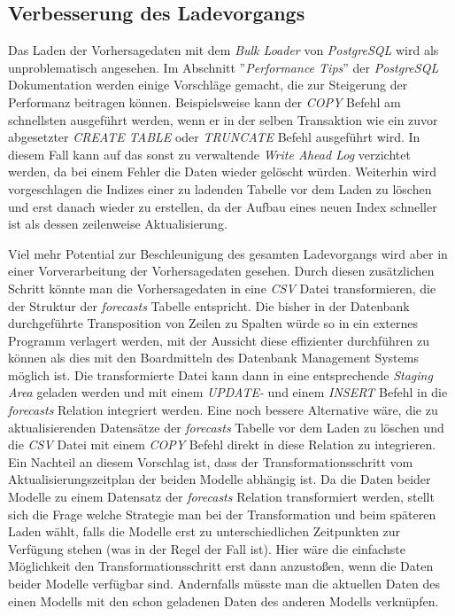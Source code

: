 \subsection{Verbesserung des Ladevorgangs}
Das Laden der Vorhersagedaten mit dem \textit{Bulk Loader} von
\textit{PostgreSQL} wird als unproblematisch angesehen. Im Abschnitt
''\textit{Performance Tips}'' \cite{postgresql:performance} der
\textit{PostgreSQL} Dokumentation werden einige Vorschläge gemacht,
die zur Steigerung der Performanz beitragen können. Beispielsweise
kann der \textit{COPY} Befehl am schnellsten ausgeführt werden, wenn
er in der selben Transaktion wie ein zuvor abgesetzter \textit{CREATE
  TABLE} oder \textit{TRUNCATE} Befehl ausgeführt wird. In diesem Fall
kann auf das sonst zu verwaltende \textit{Write Ahead Log} verzichtet
werden, da bei einem Fehler die Daten wieder gelöscht
würden. Weiterhin wird vorgeschlagen die Indizes einer zu ladenden
Tabelle vor dem Laden zu löschen und erst danach wieder zu erstellen,
da der Aufbau eines neuen Index schneller ist als dessen zeilenweise
Aktualisierung.

Viel mehr Potential zur Beschleunigung des gesamten Ladevorgangs wird
aber in einer Vorverarbeitung der Vorhersagedaten gesehen. Durch
diesen zusätzlichen Schritt könnte man die Vorhersagedaten in eine
\textit{CSV} Datei transformieren, die der Struktur der
\textit{forecasts} Tabelle entspricht. Die bisher in der Datenbank
durchgeführte Transposition von Zeilen zu Spalten würde so in ein
externes Programm verlagert werden, mit der Aussicht diese effizienter
durchführen zu können als dies mit den Boardmitteln des Datenbank
Management Systems möglich ist. Die transformierte Datei kann dann in
eine entsprechende \textit{Staging Area} geladen werden und mit einem
\textit{UPDATE-} und einem \textit{INSERT} Befehl in die
\textit{forecasts} Relation integriert werden. Eine noch bessere
Alternative wäre, die zu aktualisierenden Datensätze der
\textit{forecasts} Tabelle vor dem Laden zu löschen und die
\textit{CSV} Datei mit einem \textit{COPY} Befehl direkt in diese
Relation zu integrieren. Ein Nachteil an diesem Vorschlag ist, dass
der Transformationsschritt vom Aktualisierungszeitplan der beiden
Modelle abhängig ist. Da die Daten beider Modelle zu einem Datensatz
der \textit{forecasts} Relation transformiert werden, stellt sich die
Frage welche Strategie man bei der Transformation und beim späteren
Laden wählt, falls die Modelle erst zu unterschiedlichen Zeitpunkten
zur Verfügung stehen (was in der Regel der Fall ist). Hier wäre die
einfachste Möglichkeit den Transformationsschritt erst dann
anzustoßen, wenn die Daten beider Modelle verfügbar sind. Andernfalls
müsste man die aktuellen Daten des einen Modells mit den schon
geladenen Daten des anderen Modells verknüpfen.


